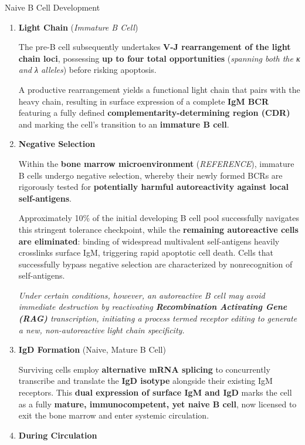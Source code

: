 \begin{core}[label=core:bc_development]{Naive B Cell Development}
\begin{enumerate}[label=(\arabic*)]
        \item \textbf{Light Chain} (\textit{Immature B Cell})

          The pre-B cell subsequently undertakes \textbf{V-J rearrangement of the light chain loci}, possessing \textbf{up to four total opportunities} (\textit{spanning both the κ and λ alleles}) before risking apoptosis.

          A productive rearrangement yields a functional light chain that pairs with the heavy chain, resulting in surface expression of a complete \textbf{IgM BCR} featuring a fully defined \textbf{complementarity-determining region (CDR)} and marking the cell's transition to an \textbf{immature B cell}.

        \item \textbf{Negative Selection}

          Within the \textbf{bone marrow microenvironment} (\textit{REFERENCE}), immature B cells undergo negative selection, whereby their newly formed BCRs are rigorously tested for \textbf{potentially harmful autoreactivity against local self-antigens}.

          Approximately 10\% of the initial developing B cell pool successfully navigates this stringent tolerance checkpoint, while the \textbf{remaining autoreactive cells are eliminated}: binding of widespread multivalent self-antigens heavily crosslinks surface IgM, triggering rapid apoptotic cell death. Cells that successfully bypass negative selection are characterized by nonrecognition of self-antigens.

          \textit{Under certain conditions, however, an autoreactive B cell may avoid immediate destruction by reactivating \textbf{Recombination Activating Gene (RAG)} transcription, initiating a process termed receptor editing to generate a new, non-autoreactive light chain specificity.}

        \item \textbf{IgD Formation} (Naive, Mature B Cell)

          Surviving cells employ \textbf{alternative mRNA splicing} to concurrently transcribe and translate the \textbf{IgD isotype} alongside their existing IgM receptors. This \textbf{dual expression of surface IgM and IgD} marks the cell as a fully \textbf{mature, immunocompetent, yet naive B cell}, now licensed to exit the bone marrow and enter systemic circulation.

        \item \textbf{During Circulation}


\end{enumerate}
\end{core}
